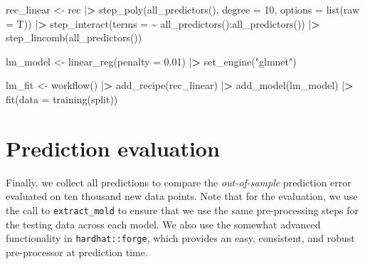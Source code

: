 \documentclass[
]{krantz}
\newenvironment{Shaded}{\begin{snugshade}}{\end{snugshade}}
\newcommand{\AttributeTok}[1]{\textcolor[rgb]{0.61,0.61,0.61}{#1}}
\newcommand{\DecValTok}[1]{\textcolor[rgb]{0.06,0.06,0.06}{#1}}
\newcommand{\ErrorTok}[1]{\textcolor[rgb]{0.14,0.14,0.14}{\textbf{#1}}}
\newcommand{\FloatTok}[1]{\textcolor[rgb]{0.06,0.06,0.06}{#1}}
\newcommand{\FunctionTok}[1]{\textcolor[rgb]{0,0,0}{#1}}
\newcommand{\NormalTok}[1]{#1}
\newcommand{\OtherTok}[1]{\textcolor[rgb]{0.37,0.37,0.37}{#1}}
\newcommand{\SpecialCharTok}[1]{\textcolor[rgb]{0,0,0}{#1}}
\newcommand{\StringTok}[1]{\textcolor[rgb]{0.5,0.5,0.5}{#1}}
\begin{document}
\begin{Shaded}
\begin{Highlighting}[]
\NormalTok{rec\_linear }\OtherTok{\textless{}{-}}\NormalTok{ rec }\SpecialCharTok{|}\ErrorTok{\textgreater{}}
  \FunctionTok{step\_poly}\NormalTok{(}\FunctionTok{all\_predictors}\NormalTok{(),}
            \AttributeTok{degree =} \DecValTok{10}\NormalTok{, }
            \AttributeTok{options =} \FunctionTok{list}\NormalTok{(}\AttributeTok{raw =}\NormalTok{ T)) }\SpecialCharTok{|}\ErrorTok{\textgreater{}}
  \FunctionTok{step\_interact}\NormalTok{(}\AttributeTok{terms =} \SpecialCharTok{\textasciitilde{}} \FunctionTok{all\_predictors}\NormalTok{()}\SpecialCharTok{:}\FunctionTok{all\_predictors}\NormalTok{()) }\SpecialCharTok{|}\ErrorTok{\textgreater{}}
  \FunctionTok{step\_lincomb}\NormalTok{(}\FunctionTok{all\_predictors}\NormalTok{())}

\NormalTok{lm\_model }\OtherTok{\textless{}{-}} \FunctionTok{linear\_reg}\NormalTok{(}\AttributeTok{penalty =} \FloatTok{0.01}\NormalTok{) }\SpecialCharTok{|}\ErrorTok{\textgreater{}}
  \FunctionTok{set\_engine}\NormalTok{(}\StringTok{"glmnet"}\NormalTok{)}

\NormalTok{lm\_fit }\OtherTok{\textless{}{-}} \FunctionTok{workflow}\NormalTok{() }\SpecialCharTok{|}\ErrorTok{\textgreater{}}
  \FunctionTok{add\_recipe}\NormalTok{(rec\_linear) }\SpecialCharTok{|}\ErrorTok{\textgreater{}}
  \FunctionTok{add\_model}\NormalTok{(lm\_model) }\SpecialCharTok{|}\ErrorTok{\textgreater{}}
  \FunctionTok{fit}\NormalTok{(}\AttributeTok{data =} \FunctionTok{training}\NormalTok{(split))}
\end{Highlighting}
\end{Shaded}

\hypertarget{prediction-evaluation}{%
\section{Prediction evaluation}\label{prediction-evaluation}}

Finally, we collect all predictions to compare the \emph{out-of-sample} prediction error evaluated on ten thousand new data points. Note that for the evaluation, we use the call to \texttt{extract\_mold} to ensure that we use the same pre-processing steps for the testing data across each model. We also use the somewhat advanced functionality in \texttt{hardhat::forge}, which provides an easy, consistent, and robust pre-processor at prediction time.
\end{document}
